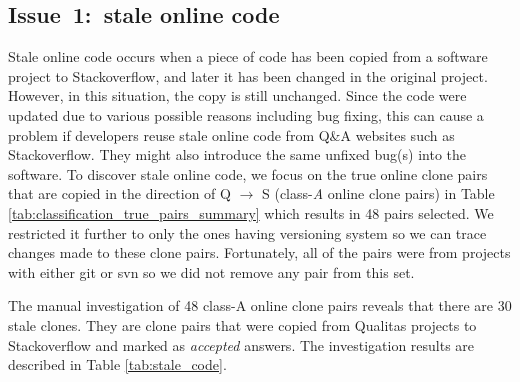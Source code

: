 \documentclass{sig-alternate-05-2015}
\begin{document}
\subsection{Issue~1:~stale online code}
Stale online code occurs when a piece of code has been copied from a software project to Stackoverflow, and later it has been changed in the original project. However, in this situation, the copy is still unchanged. Since the code were updated due to various possible reasons including bug fixing, this can cause a problem if developers reuse stale online code from Q\&A websites such as Stackoverflow. They might also introduce the same unfixed bug(s) into the software. To discover stale online code, we focus on the true online clone pairs that are copied in the direction of Q $\rightarrow$ S (class-\textit{A} online clone pairs) in Table \ref{tab:classification_true_pairs_summary} which results in 48 pairs selected. We restricted it further to only the ones having versioning system so we can trace changes made to these clone pairs. Fortunately, all of the pairs were from projects with either git or svn so we did not remove any pair from this set. 



The manual investigation of 48 class-A online clone pairs reveals that there are 30 stale clones. They are clone pairs that were copied from Qualitas projects to Stackoverflow and marked as \textit{accepted} answers.  The investigation results are described in Table \ref{tab:stale_code}.
\end{document}
